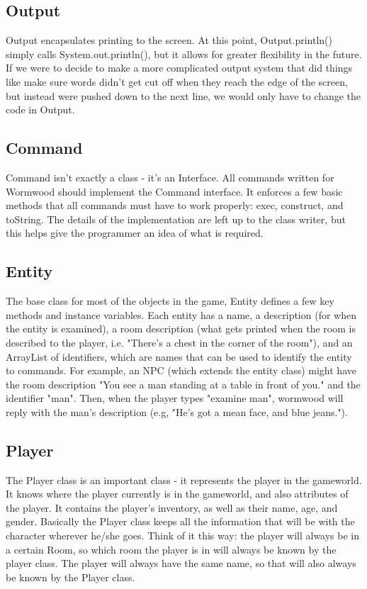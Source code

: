 \documentclass[12pt]{report}
\begin{document}
\subsection{Output}
Output encapsulates printing to the screen. At this point, Output.println() simply calls System.out.println(), but it allows for greater flexibility in the future. If we were to decide to make a more complicated output system that did things like make sure words didn't get cut off when they reach the edge of the screen, but instead were pushed down to the next line, we would only have to change the code in Output.


\subsection{Command}
Command isn't exactly a class - it's an Interface. All commands written for Wormwood should implement the Command interface. It enforces a few basic methods that all commands must have to work properly: exec, construct, and toString. The details of the implementation are left up to the class writer, but this helps give the programmer an idea of what is required. 

\subsection{Entity}
The base class for most of the objects in the game, Entity defines a few key methods and instance variables. Each entity has a name, a description (for when the entity is examined), a room description (what gets printed when the room is described to the player, i.e. "There's a chest in the corner of the room"), and an ArrayList of identifiers, which are names that can be used to identify the entity to commands. For example, an NPC (which extends the entity class) might have the room description "You see a man standing at a table in front of you." and the identifier "man". Then, when the player types "examine man", wormwood will reply with the man's description (e.g, "He's got a mean face, and blue jeans.").

\subsection{Player}
The Player class is an important class - it represents the player in the 
gameworld. It knows where the player currently is in the gameworld, and
also attributes of the player. It contains the player's inventory, as well
as their name, age, and gender. Basically the Player class keeps all the
information that will be with the character wherever he/she goes. Think of
it this way: the player will always be in a certain Room, so which room the
player is in will always be known by the player class. The player will always
have the same name, so that will also always be known by the Player class.
\end{document}
